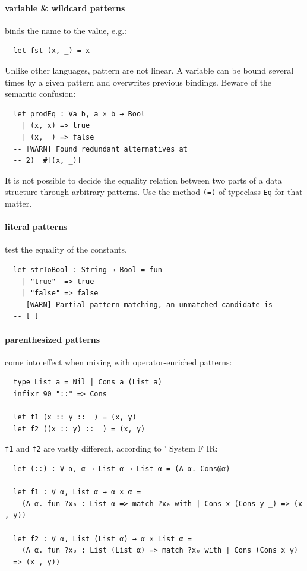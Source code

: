 \documentclass[a4paper, 11pt]{article}
\theoremstyle{remark}\newtheorem*{remark}{Remark}
\theoremstyle{definition}\newtheorem*{definition}{Definition}
\begin{document}
\paragraph{variable \& wildcard patterns} binds the name to the value, e.g.:
\begin{verbatim}
  let fst (x, _) = x
\end{verbatim}
Unlike other languages, pattern are not linear. A variable can be bound several times
by a given pattern and overwrites previous bindings. Beware of the semantic confusion:
\begin{verbatim}
  let prodEq : ∀a b, a × b → Bool
    | (x, x) => true
    | (x, _) => false
  -- [WARN] Found redundant alternatives at
  -- 2)  #[(x, _)]
\end{verbatim}
It is not possible to decide the equality relation between two parts of a data structure through
arbitrary patterns. Use the method \texttt{(=)} of typeclass \texttt{Eq} for that matter.
\paragraph{literal patterns} test the equality of the constants.
\begin{verbatim}
  let strToBool : String → Bool = fun
    | "true"  => true
    | "false" => false
  -- [WARN] Partial pattern matching, an unmatched candidate is
  -- [_]
\end{verbatim}
\paragraph{parenthesized patterns} come into effect when mixing with operator-enriched patterns:
\begin{verbatim}
  type List a = Nil | Cons a (List a)
  infixr 90 "::" => Cons

  let f1 (x :: y :: _) = (x, y)
  let f2 ((x :: y) :: _) = (x, y)
\end{verbatim}
\texttt{f1} and \texttt{f2} are vastly different, according to \Tigris' System F IR:
\begin{verbatim}
  let (::) : ∀ α, α → List α → List α = (Λ α. Cons@α)

  let f1 : ∀ α, List α → α × α =
    (Λ α. fun ?x₀ : List α => match ?x₀ with | Cons x (Cons y _) => (x , y))

  let f2 : ∀ α, List (List α) → α × List α =
    (Λ α. fun ?x₀ : List (List α) => match ?x₀ with | Cons (Cons x y) _ => (x , y))
\end{verbatim}
\end{document}
